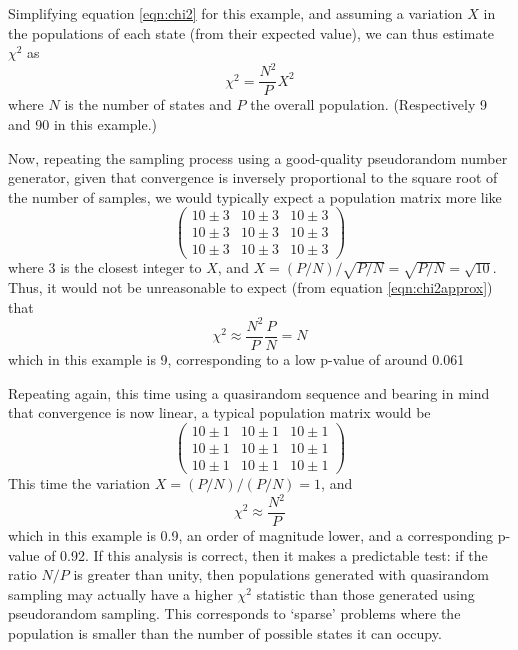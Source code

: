 \documentclass{JASSS}
\begin{document}
Simplifying equation \ref{eqn:chi2} for this example, and assuming a variation \(X\) in the 
populations of each state (from their expected value), we can thus estimate \(\chi^2\) as
\begin{equation}
\chi^2 = \frac{N^2}{P}X^2
\label{eqn:chi2approx}
\end{equation} 
where \(N\) is the number of states and \(P\) the overall population. (Respectively 9 and 90 in this example.)

Now, repeating the sampling process using a good-quality pseudorandom number generator, 
given that convergence is inversely proportional to the square root of the number of samples, 
we would typically expect a population matrix more like
\[\left( \begin{array}{ccc}
10\pm3 & 10\pm3 & 10\pm3 \\
10\pm3 & 10\pm3 & 10\pm3 \\
10\pm3 & 10\pm3 & 10\pm3 \end{array} \right)\]
where 3 is the closest integer to \(X\), and \(X=(P/N)/\sqrt{P/N}=\sqrt{P/N}=\sqrt{10}\). Thus, it would not be unreasonable to expect (from equation \ref{eqn:chi2approx}) that 
\begin{equation}
\chi^2 \approx \frac{N^2}{P}\frac{P}{N}=N
\end{equation}
which in this example is 9, corresponding to a low p-value of around 0.061

Repeating again, this time using a quasirandom sequence and bearing in mind that convergence is now linear, a typical population matrix would be 
\[\left( \begin{array}{ccc}
10\pm1 & 10\pm1 & 10\pm1 \\
10\pm1 & 10\pm1 & 10\pm1 \\
10\pm1 & 10\pm1 & 10\pm1 \end{array} \right)\]
This time the variation \(X=(P/N)/(P/N)=1\), and 
\begin{equation}
\chi^2 \approx \frac{N^2}{P}
\end{equation}
which in this example is 0.9, an order of magnitude lower, and a corresponding p-value of 0.92. If this analysis is correct, then it makes a predictable test: if the ratio \(N/P\) is greater than unity, then populations generated with quasirandom sampling may actually have a higher \(\chi^2\) statistic than those generated using pseudorandom sampling. This corresponds to `sparse' problems where the population is smaller than the number of possible states it can occupy.
\end{document}

